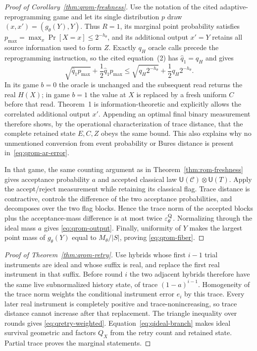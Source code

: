 \documentclass[pdflatex,sn-mathphys-num]{sn-jnl}
\theoremstyle{thmstyleone}
\theoremstyle{thmstyletwo}
\newcommand{\Unif}{\mathsf{U}}
\begin{document}
\begin{proof}[Proof of Corollary~\ref{thm:qrom-freshness}]
Use the notation of the cited adaptive-reprogramming game and let its single
distribution $p$ draw $(x,x')=(g_\theta(Y),Y)$.  Thus $R=1$, its marginal
point probability satisfies
$p_{\max}=\max_x\Pr[X=x]\le2^{-h_\theta}$, and its additional output $x'=Y$
retains all source information used to form $Z$.  Exactly $q_H$ oracle calls
precede the reprogramming instruction, so the cited equation~(2) has
$\widehat q_1=q_H$ and gives
\[
 \sqrt{\widehat q_1p_{\max}}
 +\frac12\widehat q_1p_{\max}
 \le \sqrt{q_H2^{-h_\theta}}+\frac12q_H2^{-h_\theta}.
\]
In its game $b=0$ the oracle is unchanged and the subsequent read returns the
real $H(X)$; in game $b=1$ the value at $X$ is replaced by a fresh uniform
$C$ before that read.  Theorem~1 is information-theoretic and explicitly
allows the correlated additional output $x'$.  Appending an optimal final
binary measurement therefore shows, by the operational characterization of
trace distance, that the complete retained state $E,C,Z$ obeys the same
bound.  This also explains why no unmentioned conversion from event
probability or Bures distance is present in~\eqref{eq:qrom-ar-error}.

In that game, the same counting argument as in
Theorem~\ref{thm:rom-freshness} gives acceptance probability $a$ and accepted
classical law $\Unif(\mathcal C)\otimes\Unif(T)$.  Apply the accept/reject
measurement while retaining its classical flag.  Trace distance is
contractive, controls the difference of the two acceptance probabilities,
and decomposes over the two flag blocks.  Hence the trace norm of the
accepted blocks plus the acceptance-mass difference is at most twice
$\varepsilon_\theta^{\rm Q}$.  Normalizing through the ideal mass $a$ gives
\eqref{eq:qrom-output}.  Finally, uniformity of $Y$ makes the largest point
mass of $g_\theta(Y)$ equal to $M_\theta/|S|$, proving
\eqref{eq:qrom-fiber}.
\end{proof}

\begin{proof}[Proof of Theorem~\ref{thm:qrom-retry}]
Use hybrids whose first $i-1$ trial instruments are ideal and whose suffix is
real, and replace the first real instrument in that suffix.  Before round $i$
the two adjacent hybrids therefore have the same live subnormalized history
state, of trace $(1-a)^{i-1}$.  Homogeneity of the trace norm weights the
conditional instrument error $e_i$ by this trace.  Every later real instrument
is completely positive and trace-nonincreasing, so trace distance cannot
increase after that replacement.  The triangle inequality over rounds gives
\eqref{eq:qretry-weighted}.  Equation~\eqref{eq:qideal-branch} makes ideal
survival geometric and factors $Q_X$ from the retry count and retained state.
Partial trace proves the marginal statements.
\end{proof}
\end{document}

